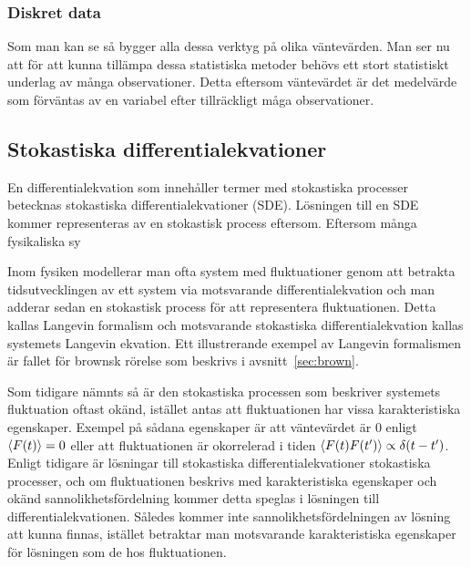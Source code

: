 \subsubsection{Diskret data}

Som man kan se så bygger alla dessa 
verktyg på olika väntevärden. Man ser nu att för att kunna tillämpa
dessa statistiska metoder behövs ett stort statistiskt underlag av
många observationer. Detta eftersom väntevärdet är det medelvärde
som förväntas av en variabel efter tillräckligt måga observationer.





\subsection{Stokastiska differentialekvationer}
En differentialekvation som innehåller termer med stokastiska processer
betecknas stokastiska differentialekvationer (SDE). Lösningen till en
SDE kommer representeras av en stokastisk process eftersom. Eftersom
många fysikaliska sy

Inom fysiken modellerar man ofta system med fluktuationer genom att betrakta
tidsutvecklingen av ett system via motsvarande differentialekvation
och man adderar sedan en stokastisk process för att representera
fluktuationen. 
Detta kallas Langevin formalism och motsvarande
stokastiska differentialekvation kallas systemets Langevin ekvation. Ett
illustrerande exempel av Langevin formalismen är fallet för brownsk
rörelse som beskrivs i avsnitt~\ref{sec:brown}.

Som tidigare nämnts så är den stokastiska
processen som beskriver systemets fluktuation oftast okänd, istället
antas att fluktuationen har vissa karakteristiska egenskaper. Exempel
på sådana egenskaper är att väntevärdet är $0$ enligt $\ev{F(t)} = 0$
eller att fluktuationen är okorrelerad i tiden
$\ev{F(t)F(t')}\propto\delta(t-t')$. 
Enligt 
tidigare 
är lösningar till
stokastiska differentialekvationer stokastiska processer, och om
fluktuationen beskrivs med karakteristiska egenskaper och okänd
sannolikhetsfördelning kommer detta speglas i lösningen till
differentialekvationen. Således kommer inte sannolikhetsfördelningen
av lösning att kunna finnas, istället betraktar man motsvarande
karakteristiska egenskaper för lösningen som de hos
fluktuationen. 






